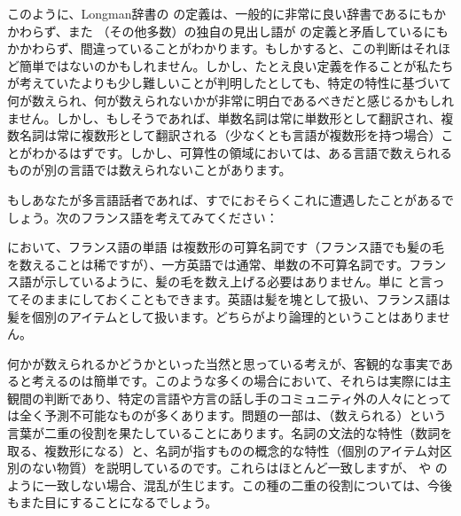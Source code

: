 このように、Longman辞書の  の定義は、一般的に非常に良い辞書であるにもかかわらず、また （その他多数）の独自の見出し語が  の定義と矛盾しているにもかかわらず、間違っていることがわかります。もしかすると、この判断はそれほど簡単ではないのかもしれません。しかし、たとえ良い定義を作ることが私たちが考えていたよりも少し難しいことが判明したとしても、特定の特性に基づいて何が数えられ、何が数えられないかが非常に明白であるべきだと感じるかもしれません。しかし、もしそうであれば、単数名詞は常に単数形として翻訳され、複数名詞は常に複数形として翻訳される（少なくとも言語が複数形を持つ場合）ことがわかるはずです。しかし、可算性の領域においては、ある言語で数えられるものが別の言語では数えられないことがあります。

もしあなたが多言語話者であれば、すでにおそらくこれに遭遇したことがあるでしょう。次のフランス語を考えてみてください：

\label{ex:cheveaux}
\z
{} において、フランス語の単語  は複数形の可算名詞です（フランス語でも髪の毛を数えることは稀ですが）、一方英語では通常、単数の不可算名詞です。フランス語が示しているように、髪の毛を数え上げる必要はありません。単に  と言ってそのままにしておくこともできます。英語は髪を塊として扱い、フランス語は髪を個別のアイテムとして扱います。どちらがより論理的ということはありません。

何かが数えられるかどうかといった当然と思っている考えが、客観的な事実であると考えるのは簡単です。このような多くの場合において、それらは実際には主観間の判断であり、特定の言語や方言の話し手のコミュニティ外の人々にとっては全く予測不可能なものが多くあります。問題の一部は、（数えられる）という言葉が二重の役割を果たしていることにあります。名詞の文法的な特性（数詞を取る、複数形になる）と、名詞が指すものの概念的な特性（個別のアイテム対区別のない物質）を説明しているのです。これらはほとんど一致しますが、 や  のように一致しない場合、混乱が生じます。この種の二重の役割については、今後もまた目にすることになるでしょう。

